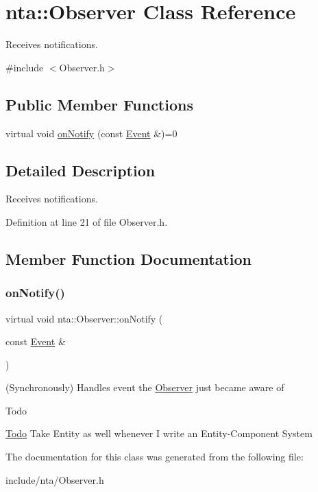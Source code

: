 \hypertarget{classnta_1_1Observer}{}\section{nta\+:\+:Observer Class Reference}
\label{classnta_1_1Observer}


Receives notifications.  




{\ttfamily \#include $<$Observer.\+h$>$}

\subsection*{Public Member Functions}
\begin{DoxyCompactItemize}
\item 
virtual void \hyperlink{classnta_1_1Observer_a828574b2ddb58a600311d2da9c6cd0a5}{on\+Notify} (const \hyperlink{structnta_1_1Event}{Event} \&)=0
\end{DoxyCompactItemize}


\subsection{Detailed Description}
Receives notifications. 

Definition at line 21 of file Observer.\+h.



\subsection{Member Function Documentation}
\mbox{\label{classnta_1_1Observer_a828574b2ddb58a600311d2da9c6cd0a5}} 
\subsubsection{\texorpdfstring{on\+Notify()}{onNotify()}}
{\footnotesize\ttfamily virtual void nta\+::\+Observer\+::on\+Notify (\begin{DoxyParamCaption}\item[{const \hyperlink{structnta_1_1Event}{Event} \&}]{ }\end{DoxyParamCaption})\hspace{0.3cm}{\ttfamily [pure virtual]}}

(Synchronously) Handles event the \hyperlink{classnta_1_1Observer}{Observer} just became aware of \begin{DoxyRefDesc}{Todo}
\item[\hyperlink{todo__todo000009}{Todo}]Take Entity as well whenever I write an Entity-\/\+Component System \end{DoxyRefDesc}


The documentation for this class was generated from the following file\+:\begin{DoxyCompactItemize}
\item 
include/nta/Observer.\+h\end{DoxyCompactItemize}
